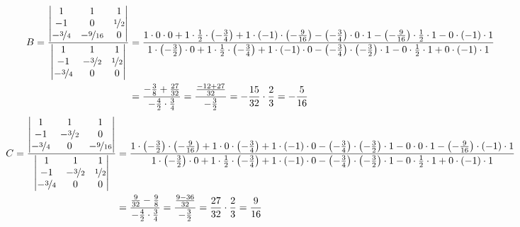 \documentclass[11pt,a4paper,DIV=12]{scrartcl}
\begin{document}
%
%
%
\begin{align}
	B=
	\frac{
		\begin{vmatrix}
			1 & 1 & 1 \\
			-1 & 0 & \nicefrac{1}{2} \\
			-\nicefrac{3}{4} & -\nicefrac{9}{16}&0
		\end{vmatrix}
	}
	{
		\begin{vmatrix}
			1 & 1 & 1 \\
			-1 & -\nicefrac{3}{2} & \nicefrac{1}{2} \\
			-\nicefrac{3}{4} & 0 & 0
		\end{vmatrix}
	}
	&=
	\frac{1\cdot 0 \cdot 0+ 1 \cdot \frac{1}{2}\cdot \left(-\frac{3}{4}\right)+1\cdot \left(-1\right)\cdot \left(-\frac{9}{16}\right)-\left(-\frac{3}{4}\right)\cdot 0 \cdot 1 -\left(-\frac{9}{16}\right)\cdot \frac{1}{2}\cdot 1 - 0\cdot \left(-1\right)\cdot 1}
	{1\cdot \left(-\frac{3}{2}\right)\cdot 0 +1\cdot \frac{1}{2}\cdot \left(-\frac{3}{4}\right)+1\cdot \left(-1\right) \cdot 0- \left(-\frac{3}{4}\right)\cdot \left(-\frac{3}{2}\right)\cdot 1 -0\cdot \frac{1}{2}\cdot 1 + 0\cdot \left(-1\right) \cdot 1}\nonumber \\
	&=\frac{-\frac{3}{8}+\frac{27}{32}}{-\frac{4}{2}\cdot\frac{3}{4}}=\frac{\frac{-12+27}{32}}{-\frac{3}{2}}=-\frac{15}{32}\cdot\frac{2}{3}=-\frac{5}{16}
\end{align}
\begin{align}
	C=
	\frac{
		\begin{vmatrix}
			1 & 1 & 1 \\
			-1 & -\nicefrac{3}{2} & 0 \\
			-\nicefrac{3}{4}& 0 & -\nicefrac{9}{16}
		\end{vmatrix}
	}
	{
		\begin{vmatrix}
			1 & 1 & 1 \\
			-1 & -\nicefrac{3}{2} & \nicefrac{1}{2} \\
			-\nicefrac{3}{4} & 0 & 0
		\end{vmatrix}
	}
	&=
	\frac{1\cdot\left(-\frac{3}{2}\right)\cdot\left(-\frac{9}{16}\right)+1\cdot 0 \cdot \left(-\frac{3}{4}\right)+1\cdot \left(-1\right)\cdot 0-\left(-\frac{3}{4}\right)\cdot \left(-\frac{3}{2}\right)\cdot 1 -0 \cdot 0 \cdot 1 - \left(-\frac{9}{16}\right)\cdot \left(-1\right)\cdot 1}
	{1\cdot \left(-\frac{3}{2}\right)\cdot 0 +1\cdot \frac{1}{2}\cdot \left(-\frac{3}{4}\right)+1\cdot \left(-1\right) \cdot 0- \left(-\frac{3}{4}\right)\cdot \left(-\frac{3}{2}\right)\cdot 1 -0\cdot \frac{1}{2}\cdot 1 + 0\cdot \left(-1\right) \cdot 1}\nonumber \\
	&=
	\frac{\frac{9}{32}-\frac{9}{8}}{-\frac{4}{2}\cdot\frac{3}{4}}=\frac{\frac{9-36}{32}}{-\frac{3}{2}}=\frac{27}{32}\cdot \frac{2}{3}=\frac{9}{16}
\end{align}
\end{document}

